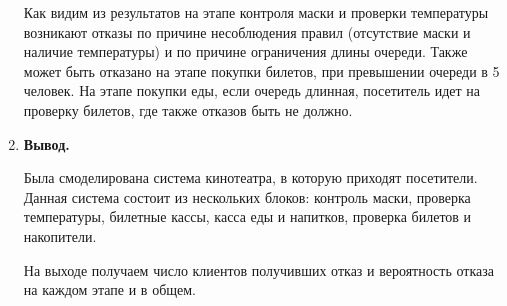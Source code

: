 \documentclass[a4paper,14pt]{extreport} %
\begin{document}
\begin{enumerate}
Как видим из результатов на этапе контроля маски и проверки температуры возникают отказы по причине несоблюдения правил (отсутствие маски и наличие температуры) и по причине ограничения длины очереди. Также может быть отказано на этапе покупки билетов, при превышении очереди в 5 человек. На этапе покупки еды, если очередь длинная, посетитель идет на проверку билетов, где также отказов быть не должно. 

\item \textbf{Вывод. }

Была смоделирована система кинотеатра, в которую приходят посетители. Данная система состоит из нескольких блоков: контроль маски, проверка температуры, билетные кассы, касса еды и напитков, проверка билетов и накопители. 

На выходе получаем число клиентов получивших отказ и вероятность отказа на каждом этапе и в общем. 

\end{enumerate}
\end{document}
